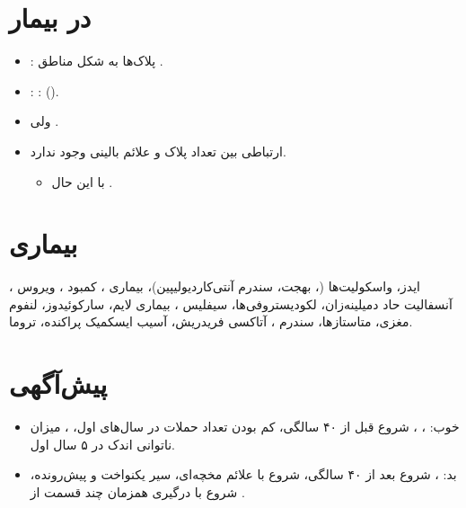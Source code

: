 \documentclass[a4paper,12pt]{extbook}
\begin{document}
\section*{ در بیمار }
\begin{itemize}
\item {}: پلاک‌ها به شکل مناطق .
\item {}: :  ().
\item {} ولی .
\item ارتباطی بین تعداد پلاک و علائم بالینی وجود ندارد.
\begin{itemize}
\item با این حال .
\end{itemize}
\end{itemize}

\section*{ بیماری }
\noindent
ایدز، واسکولیت‌ها (، بهجت، سندرم آنتی‌کاردیولیپین)، بیماری ، کمبود ، ویروس ، آنسفالیت حاد دمیلینه‌زان، لکودیستروفی‌ها، سیفلیس ، بیماری لایم، سارکوئیدوز، لنفوم مغزی، متاستازها، سندرم ، آتاکسی فریدریش، آسیب ایسکمیک پراکنده، تروما.
\section*{پیش‌آگهی }
\begin{itemize}
\item خوب: ، ، شروع قبل از ۴۰ سالگی، کم بودن تعداد حملات در سال‌های اول، ، میزان ناتوانی اندک در ۵ سال اول.
\item بد: ، شروع بعد از ۴۰ سالگی، شروع با علائم مخچه‌ای، سیر یکنواخت و پیش‌رونده، شروع با درگیری همزمان چند قسمت از .
\end{itemize}
\end{document}
